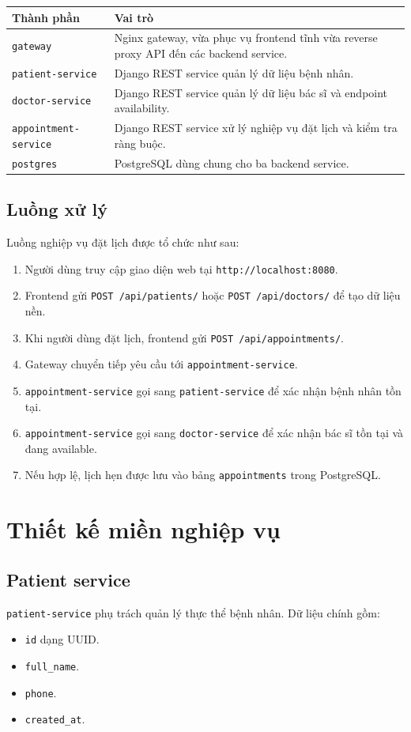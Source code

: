 \documentclass[12pt,a4paper]{article}
\begin{document}
\begin{longtable}{p{3.3cm}p{10cm}}
\toprule
\textbf{Thành phần} & \textbf{Vai trò} \\
\midrule
\texttt{gateway} & Nginx gateway, vừa phục vụ frontend tĩnh vừa reverse proxy API đến các backend service. \\
\texttt{patient-service} & Django REST service quản lý dữ liệu bệnh nhân. \\
\texttt{doctor-service} & Django REST service quản lý dữ liệu bác sĩ và endpoint availability. \\
\texttt{appointment-service} & Django REST service xử lý nghiệp vụ đặt lịch và kiểm tra ràng buộc. \\
\texttt{postgres} & PostgreSQL dùng chung cho ba backend service. \\
\bottomrule
\end{longtable}

\subsection{Luồng xử lý}
Luồng nghiệp vụ đặt lịch được tổ chức như sau:
\begin{enumerate}[leftmargin=1.5em]
  \item Người dùng truy cập giao diện web tại \texttt{http://localhost:8080}.
  \item Frontend gửi \texttt{POST /api/patients/} hoặc \texttt{POST /api/doctors/} để tạo dữ liệu nền.
  \item Khi người dùng đặt lịch, frontend gửi \texttt{POST /api/appointments/}.
  \item Gateway chuyển tiếp yêu cầu tới \texttt{appointment-service}.
  \item \texttt{appointment-service} gọi sang \texttt{patient-service} để xác nhận bệnh nhân tồn tại.
  \item \texttt{appointment-service} gọi sang \texttt{doctor-service} để xác nhận bác sĩ tồn tại và đang available.
  \item Nếu hợp lệ, lịch hẹn được lưu vào bảng \texttt{appointments} trong PostgreSQL.
\end{enumerate}

\section{Thiết kế miền nghiệp vụ}
\subsection{Patient service}
\texttt{patient-service} phụ trách quản lý thực thể bệnh nhân. Dữ liệu chính gồm:
\begin{itemize}[leftmargin=1.5em]
  \item \texttt{id} dạng UUID.
  \item \texttt{full\_name}.
  \item \texttt{phone}.
  \item \texttt{created\_at}.
\end{itemize}
\end{document}
